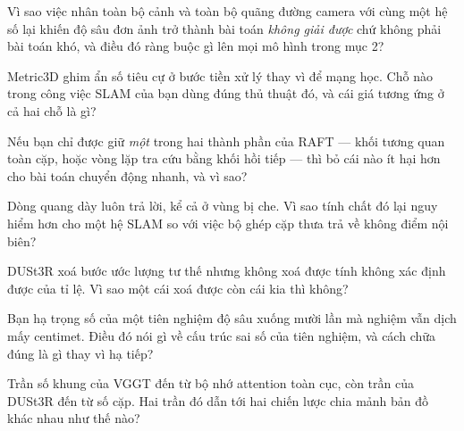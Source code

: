 \documentclass[../../deep_learning.tex]{subfiles}
\begin{document}
\begin{tukiem}
\item Vì sao việc nhân toàn bộ cảnh và toàn bộ quãng đường camera với cùng một hệ số lại khiến độ sâu đơn ảnh trở thành bài toán \emph{không giải được} chứ không phải bài toán khó, và điều đó ràng buộc gì lên mọi mô hình trong mục 2?
\item Metric3D ghim ẩn số tiêu cự ở bước tiền xử lý thay vì để mạng học. Chỗ nào trong công việc SLAM của bạn dùng đúng thủ thuật đó, và cái giá tương ứng ở cả hai chỗ là gì?
\item Nếu bạn chỉ được giữ \emph{một} trong hai thành phần của RAFT --- khối tương quan toàn cặp, hoặc vòng lặp tra cứu bằng khối hồi tiếp --- thì bỏ cái nào ít hại hơn cho bài toán chuyển động nhanh, và vì sao?
\item Dòng quang dày luôn trả lời, kể cả ở vùng bị che. Vì sao tính chất đó lại nguy hiểm hơn cho một hệ SLAM so với việc bộ ghép cặp thưa trả về không điểm nội biên?
\item DUSt3R xoá bước ước lượng tư thế nhưng không xoá được tính không xác định được của tỉ lệ. Vì sao một cái xoá được còn cái kia thì không?
\item Bạn hạ trọng số của một tiên nghiệm độ sâu xuống mười lần mà nghiệm vẫn dịch mấy centimet. Điều đó nói gì về cấu trúc sai số của tiên nghiệm, và cách chữa đúng là gì thay vì hạ tiếp?
\item Trần số khung của VGGT đến từ bộ nhớ attention toàn cục, còn trần của DUSt3R đến từ số cặp. Hai trần đó dẫn tới hai chiến lược chia mảnh bản đồ khác nhau như thế nào?
\end{tukiem}

\ifSubfilesClassLoaded{\printbibliography[title={Nguồn}]}{}
\end{document}
